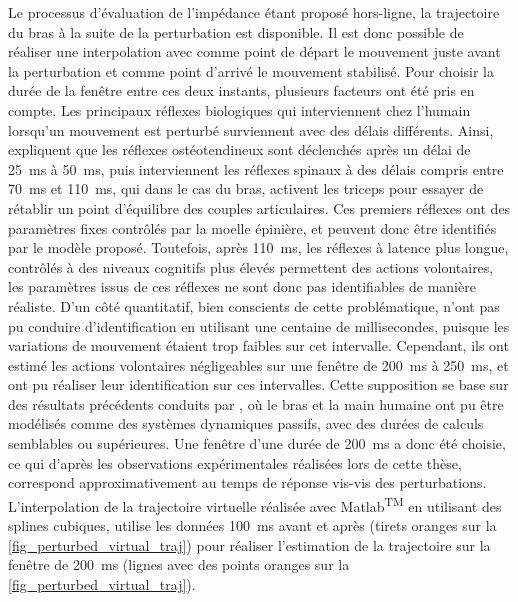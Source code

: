 \documentclass[12pt, a4paper]{article} %
\numberwithin{equation}{section}
\begin{document}
Le processus d'évaluation de l'impédance étant proposé hors-ligne, la trajectoire du bras à la suite de la perturbation est disponible. Il est donc possible de réaliser une interpolation avec comme point de départ le mouvement juste avant la perturbation et comme point d'arrivé le mouvement stabilisé. Pour choisir la durée de la fenêtre entre ces deux instants, plusieurs facteurs ont été pris en compte. 
%
\newlineBlank
%
Les principaux réflexes biologiques qui interviennent chez l'humain lorsqu'un mouvement est perturbé surviennent avec des délais différents. Ainsi, \cite{lakatos_conditioning_2011} expliquent que les réflexes ostéotendineux sont déclenchés après un délai de \SI{25}{\milli\second} à \SI{50}{\milli\second}, puis interviennent les réflexes spinaux à des délais compris entre \SI{70}{\milli\second} et \SI{110}{\milli\second}, qui dans le cas du bras, activent les triceps pour essayer de rétablir un point d'équilibre des couples articulaires. Ces premiers réflexes ont des paramètres fixes contrôlés par la moelle épinière, et peuvent donc être identifiés par le modèle proposé. Toutefois, après \SI{110}{\milli\second}, les réflexes à latence plus longue, contrôlés à des niveaux cognitifs plus élevés permettent des actions volontaires, les paramètres issus de ces réflexes ne sont donc pas identifiables de manière réaliste.
%
\newlineBlank
%
D'un côté quantitatif, \cite{erden_end-point_2015, erden_hand_2015} bien conscients de cette problématique, n'ont pas pu conduire d'identification en utilisant une centaine de millisecondes, puisque les variations de mouvement étaient trop faibles sur cet intervalle. Cependant, ils ont estimé les actions volontaires négligeables sur une fenêtre de \SI{200}{\milli\second} à \SI{250}{\milli\second}, et ont pu réaliser leur identification sur ces intervalles. Cette supposition se base sur des résultats précédents conduits par \cite{mussa-ivaldi_neural_1985,tsuji_human_1995,gomi_human_1997,burdet_method_2000}, où le bras et la main humaine ont pu être modélisés comme des systèmes dynamiques passifs, avec des durées de calculs semblables ou supérieures.
%
\newlineBlank
%
Une fenêtre d'une durée de \SI{200}{\milli\second} a donc été choisie, ce qui d'après les observations expérimentales réalisées lors de cette thèse, correspond approximativement au temps de réponse vis-vis des perturbations. L'interpolation de la trajectoire virtuelle réalisée avec Matlab\textsuperscript{TM} en utilisant des splines cubiques, utilise les données \SI{100}{\milli\second} avant et après (tirets oranges sur la \cref{fig_perturbed_virtual_traj}) pour réaliser l'estimation de la trajectoire sur la fenêtre de \SI{200}{\milli\second} (lignes avec des points oranges sur la \cref{fig_perturbed_virtual_traj}).
\end{document}
